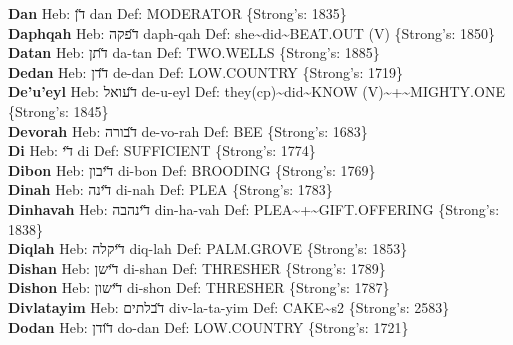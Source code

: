 {\textbf{Dan} Heb: {\large\H דן} dan Def: MODERATOR \{Strong's: 1835\}\hfill{}\\

\textbf{Daphqah} Heb: {\large\H דפקה} daph-qah Def: she\textasciitilde{}did\textasciitilde{}BEAT.OUT (V) \{Strong's: 1850\}\hfill{}\\

\textbf{Datan} Heb: {\large\H דתן} da-tan Def: TWO.WELLS \{Strong's: 1885\}\hfill{}\\

\textbf{Dedan} Heb: {\large\H דדן} de-dan Def: LOW.COUNTRY \{Strong's: 1719\}\hfill{}\\

\textbf{De'u'eyl} Heb: {\large\H דעואל} de-u-eyl Def: they(cp)\textasciitilde{}did\textasciitilde{}KNOW (V)\textasciitilde{}+\textasciitilde{}MIGHTY.ONE \{Strong's: 1845\}\hfill{}\\

\textbf{Devorah} Heb: {\large\H דבורה} de-vo-rah Def: BEE \{Strong's: 1683\}\hfill{}\\

\textbf{Di} Heb: {\large\H די} di Def: SUFFICIENT \{Strong's: 1774\}\hfill{}\\

\textbf{Dibon} Heb: {\large\H דיבון} di-bon Def: BROODING \{Strong's: 1769\}\hfill{}\\

\textbf{Dinah} Heb: {\large\H דינה} di-nah Def: PLEA \{Strong's: 1783\}\hfill{}\\

\textbf{Dinhavah} Heb: {\large\H דינהבה} din-ha-vah Def: PLEA\textasciitilde{}+\textasciitilde{}GIFT.OFFERING \{Strong's: 1838\}\hfill{}\\

\textbf{Diqlah} Heb: {\large\H דיקלה} diq-lah Def: PALM.GROVE \{Strong's: 1853\}\hfill{}\\

\textbf{Dishan} Heb: {\large\H דישן} di-shan Def: THRESHER \{Strong's: 1789\}\hfill{}\\

\textbf{Dishon} Heb: {\large\H דישון} di-shon Def: THRESHER \{Strong's: 1787\}\hfill{}\\

\textbf{Divlatayim} Heb: {\large\H דבלתים} div-la-ta-yim Def: CAKE\textasciitilde{}s2 \{Strong's: 2583\}\hfill{}\\

\textbf{Dodan} Heb: {\large\H דודן} do-dan Def: LOW.COUNTRY \{Strong's: 1721\}\hfill{}\\

}
